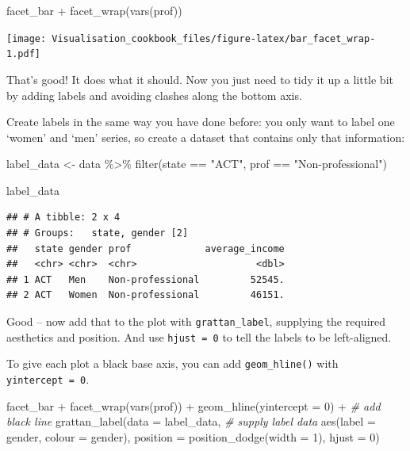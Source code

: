 \documentclass[
]{book}
\newenvironment{Shaded}{\begin{snugshade}}{\end{snugshade}}
\newcommand{\AttributeTok}[1]{\textcolor[rgb]{0.77,0.63,0.00}{#1}}
\newcommand{\CommentTok}[1]{\textcolor[rgb]{0.56,0.35,0.01}{\textit{#1}}}
\newcommand{\DecValTok}[1]{\textcolor[rgb]{0.00,0.00,0.81}{#1}}
\newcommand{\FunctionTok}[1]{\textcolor[rgb]{0.00,0.00,0.00}{#1}}
\newcommand{\NormalTok}[1]{#1}
\newcommand{\OtherTok}[1]{\textcolor[rgb]{0.56,0.35,0.01}{#1}}
\newcommand{\SpecialCharTok}[1]{\textcolor[rgb]{0.00,0.00,0.00}{#1}}
\newcommand{\StringTok}[1]{\textcolor[rgb]{0.31,0.60,0.02}{#1}}
\begin{document}
\begin{Shaded}
\begin{Highlighting}[]
\NormalTok{facet\_bar }\SpecialCharTok{+}
  \FunctionTok{facet\_wrap}\NormalTok{(}\FunctionTok{vars}\NormalTok{(prof))}
\end{Highlighting}
\end{Shaded}

\texttt{[image: Visualisation\_cookbook\_files/figure-latex/bar\_facet\_wrap-1.pdf]}

That's good! It does what it should. Now you just need to tidy it up a little bit by adding labels and avoiding clashes along the bottom axis.

Create labels in the same way you have done before: you only want to label one `women' and `men' series, so create a dataset that contains only that information:

\begin{Shaded}
\begin{Highlighting}[]
\NormalTok{label\_data }\OtherTok{\textless{}{-}}\NormalTok{ data }\SpecialCharTok{\%\textgreater{}\%} 
  \FunctionTok{filter}\NormalTok{(state }\SpecialCharTok{==} \StringTok{"ACT"}\NormalTok{,}
\NormalTok{         prof }\SpecialCharTok{==} \StringTok{"Non{-}professional"}\NormalTok{)}

\NormalTok{label\_data}
\end{Highlighting}
\end{Shaded}

\begin{verbatim}
## # A tibble: 2 x 4
## # Groups:   state, gender [2]
##   state gender prof             average_income
##   <chr> <chr>  <chr>                     <dbl>
## 1 ACT   Men    Non-professional         52545.
## 2 ACT   Women  Non-professional         46151.
\end{verbatim}

Good -- now add that to the plot with \texttt{grattan\_label}, supplying the required aesthetics and position. And use \texttt{hjust\ =\ 0} to tell the labels to be left-aligned.

To give each plot a black base axis, you can add \texttt{geom\_hline()} with \texttt{yintercept\ =\ 0}.

\begin{Shaded}
\begin{Highlighting}[]
\NormalTok{facet\_bar }\SpecialCharTok{+}
  \FunctionTok{facet\_wrap}\NormalTok{(}\FunctionTok{vars}\NormalTok{(prof)) }\SpecialCharTok{+} 
  \FunctionTok{geom\_hline}\NormalTok{(}\AttributeTok{yintercept =} \DecValTok{0}\NormalTok{) }\SpecialCharTok{+}  \CommentTok{\# add black line}
  \FunctionTok{grattan\_label}\NormalTok{(}\AttributeTok{data =}\NormalTok{ label\_data, }\CommentTok{\# supply label data}
                \FunctionTok{aes}\NormalTok{(}\AttributeTok{label =}\NormalTok{ gender,}
                    \AttributeTok{colour =}\NormalTok{ gender),}
                \AttributeTok{position =} \FunctionTok{position\_dodge}\NormalTok{(}\AttributeTok{width =} \DecValTok{1}\NormalTok{), }
                \AttributeTok{hjust =} \DecValTok{0}\NormalTok{)}
\end{Highlighting}
\end{Shaded}
\end{document}
